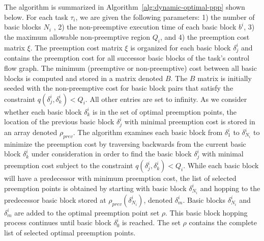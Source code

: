 \noindent
\newline
The algorithm is summarized in Algorithm~\ref{alg:dynamic-optimal-ppp} shown below.  For each task $\tau_i$, we are given the following parameters: 1) the number of basic blocks $N_i$ , 2) the non-preemptive execution time of each basic block $b^i$, 3) the maximum allowable non-preemptive region $Q_i$, and 4) the preemption cost matrix $\xi$.  The preemption cost matrix $\xi$ is organized for each basic block \begin{math}\delta_{j}^{i}\end{math} and contains the preemption cost for all successor basic blocks of the task's control flow graph.  The minimum (preemptive or non-preemptive) cost between all basic blocks is computed and stored in a matrix denoted $B$.  The $B$ matrix is initially seeded with the non-preemptive cost for basic block pairs that satisfy the constraint $q(\delta_{j}^{i},\delta_{k}^{i}) < Q_{i}$. All other entries are set to infinity.  As we consider whether each basic block $\delta_{k}^{i}$ is in the set of optimal preemption points, the location of the previous basic block $\delta_{j}^{i}$ with minimal preemption cost is stored in an array denoted $\rho_{prev}$.  The algorithm examines each basic block from \begin{math}\delta_{1}^{i}\end{math} to \begin{math}\delta_{N_i}^{i}\end{math} to minimize the preemption cost by traversing backwards from the current basic block $\delta_{k}^{i}$ under consideration in order to find the basic block $\delta_{j}^{i}$ with minimal preemption cost subject to the constraint $q(\delta_{j}^{i},\delta_{k}^{i}) < Q_{i}$.  While each basic block will have a predecessor with minimum preemption cost, the list of selected preemption points is obtained by starting with basic block $\delta_{N_i}^{i}$ and hopping to the predecessor basic block stored at $\rho_{prev}(\delta_{N_i}^{i})$, denoted $\delta_{m}^{i}$.  Basic blocks $\delta_{N_i}^{i}$ and $\delta_{m}^{i}$ are added to the optimal preemption point set $\rho$.  This basic block hopping process continues until basic block $\delta_{0}^{i}$ is reached.  The set $\rho$ contains the complete list of selected optimal preemption points.
